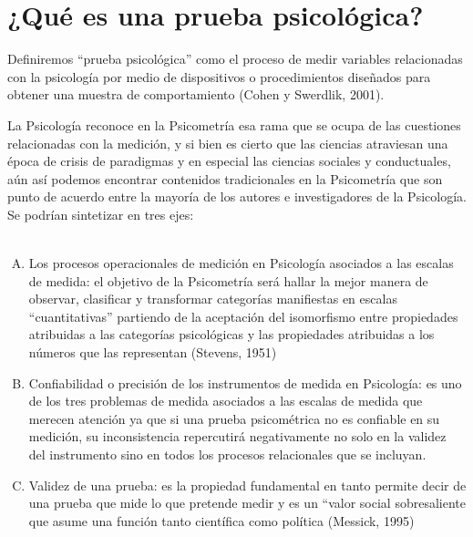 \section{¿Qué es una prueba psicológica?}

Definiremos ``prueba psicológica'' como el proceso de medir variables relacionadas con la psicología por medio de dispositivos o procedimientos diseñados para obtener una muestra de comportamiento (Cohen y Swerdlik, 2001). \cite{pruebapsicologica1}

La Psicología reconoce en la Psicometría esa rama que se ocupa de las cuestiones relacionadas con la medición, y si bien es cierto que las ciencias atraviesan una época de crisis de paradigmas y en especial las ciencias sociales y conductuales, aún así podemos encontrar contenidos tradicionales en la Psicometría que son punto de acuerdo entre la mayoría de los autores e investigadores de la Psicología. Se podrían sintetizar en tres ejes: 
\\\\
\begin{enumerate}[A)]
\item Los procesos operacionales de medición en Psicología asociados a las escalas de medida: el objetivo de la Psicometría será hallar la mejor manera de observar, clasificar y transformar categorías manifiestas en escalas ``cuantitativas'' partiendo de la aceptación del isomorfismo entre propiedades atribuidas a las categorías psicológicas y las propiedades atribuidas a los números que las representan (Stevens, 1951)
\item Confiabilidad o precisión de los instrumentos de medida en Psicología: es uno de los tres problemas de medida asociados a las escalas de medida que merecen atención ya que si una prueba psicométrica no es confiable en su medición, su inconsistencia repercutirá negativamente no solo en la validez del instrumento sino en todos los procesos relacionales que se incluyan.
\item Validez de una prueba: es la propiedad fundamental en tanto permite decir de una prueba que mide lo que pretende medir y es un “valor social sobresaliente que asume una función tanto científica como política (Messick, 1995) \cite{pruebapsicologica2}
\end{enumerate}
